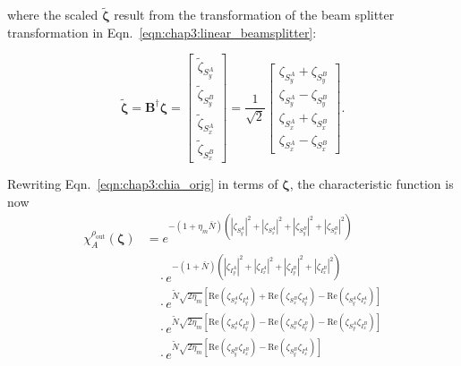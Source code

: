 \documentclass[aps,twocolumn,secnumarabic,amsmath,amssymb,pra,groupedaddress,
showpacs, showkeys]{revtex4-1}
\newcommand{\pna}[1]{\left(#1\right)}
\newcommand{\pnb}[1]{\left[#1\right]}
\newcommand{\eqn}[1]{
\begin{equation}
	#1
\end{equation}
}
\begin{document}
where the scaled $\tilde{\bm{\zeta}}$ result from the transformation of the
beam splitter transformation in Eqn.~\ref{eqn:chap3:linear_beamsplitter}:
\eqn{
\tilde{\bm{\zeta}}=\mathbf{B}^{\dagger}\bm{\zeta}=\left[
\begin{array}{c}
	\tilde{\zeta}_{S_y^A} \\
	\tilde{\zeta}_{S_y^B} \\
	\tilde{\zeta}_{S_x^A} \\
	\tilde{\zeta}_{S_x^B}
\end{array}
\right]=\frac{1}{\sqrt{2}}
\left[
\begin{array}{c}
	\zeta_{S_y^A} + \zeta_{S_y^B} \\
	\zeta_{S_y^A} - \zeta_{S_y^B} \\
	\zeta_{S_x^A} + \zeta_{S_x^B}\\
	\zeta_{S_x^A} - \zeta_{S_x^B}
\end{array}
\right].\label{eq:scaled_vars}
}
Rewriting Eqn.~\ref{eqn:chap3:chia_orig} in terms of $\bm{\zeta}$, the
characteristic function is now
\begin{align}
  \chi_A^{\rho_{\textrm{out}}}\pna{\bm{\zeta}} & =
  e^{-\pna{1+\eta_{m}\bar{N}}\pna{|\zeta_{S_y^A}|^2+|\zeta_{S_x^A}|^2+|\zeta_{S_y^B}|^2+|\zeta_{S_x^B}|^2}}
  \nonumber \\
&  \quad\cdot
e^{-\pna{1+\bar{N}}\pna{|\zeta_{I_y^A}|^2+|\zeta_{I_x^A}|^2+|\zeta_{I_y^B}|^2+|\zeta_{I_x^B}|^2}}
\nonumber \\
&  \quad\cdot e^{\tilde{N}\sqrt{2\eta_{m}}\pnb{\textrm{Re}\pna{\zeta_{S_x^A} \zeta_{I_y^A}}
    +\textrm{Re}\pna{\zeta_{S_x^B}\zeta_{I_y^A}}
    -\textrm{Re}\pna{\zeta_{S_y^A}\zeta_{I_x^A}}}}\nonumber \\
&  \quad\cdot e^{\tilde{N}\sqrt{2\eta_{m}}\pnb{\textrm{Re}\pna{\zeta_{S_x^A}\zeta_{I_y^B}}
    -\textrm{Re}\pna{\zeta_{S_x^B}\zeta_{I_y^B}}
    -\textrm{Re}\pna{\zeta_{S_y^A}\zeta_{I_x^B}}}} \nonumber \\
&  \quad\cdot e^{\tilde{N}\sqrt{2\eta_{m}}\pnb{\textrm{Re}\pna{\zeta_{S_y^B} \zeta_{I_x^B}}-\textrm{Re}\pna{\zeta_{S_y^B} \zeta_{I_x^A}}}} 
\label{eq:char_final}
\end{align}
\end{document}
